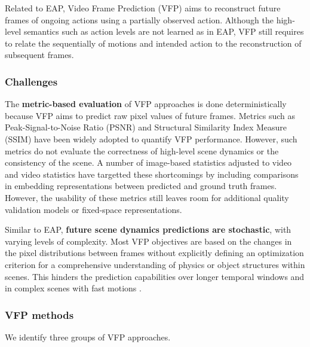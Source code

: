 Related to EAP, Video Frame Prediction (VFP) aims to reconstruct future frames of ongoing actions using a partially observed action. Although the high-level semantics such as action levels are not learned as in EAP, VFP still requires to relate the sequentially of motions and intended action to the reconstruction of subsequent frames.

\subsubsection{Challenges}

The \textbf{metric-based evaluation} of VFP approaches is done deterministically because VFP aims to predict raw pixel values of future frames. Metrics such as Peak-Signal-to-Noise Ratio (PSNR) and Structural Similarity Index Measure (SSIM) have been widely adopted to quantify VFP performance. However, such metrics do not evaluate the correctness of high-level scene dynamics or the consistency of the scene. A number of image-based statistics adjusted to video \citep{czolbe2020loss,ding2020image,zhang2018unreasonable} and video statistics \citep{hou2022perceptual,li2019quality} have targetted these shortcomings by including comparisons in embedding representations between predicted and ground truth frames. However, the usability of these metrics still leaves room for additional quality validation models or fixed-space representations.

Similar to EAP, \textbf{future scene dynamics predictions are stochastic}, with varying levels of complexity. Most VFP objectives are based on the changes in the pixel distributions between frames without explicitly defining an optimization criterion for a comprehensive understanding of physics or object structures within scenes. This hinders the prediction capabilities over longer temporal windows and in complex scenes with fast motions \citep{ming2024survey}.


\subsubsection{VFP methods}

We identify three groups of VFP approaches.

